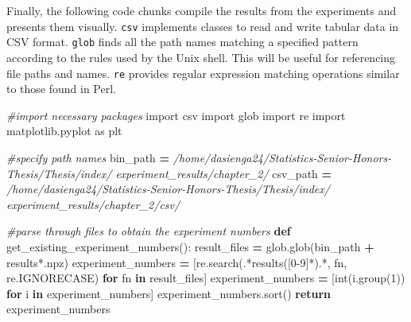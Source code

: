 \documentclass[12pt, twoside]{amherstthesis}
\newenvironment{Shaded}{\begin{snugshade}}{\end{snugshade}}
\newcommand{\BuiltInTok}[1]{#1}
\newcommand{\CommentTok}[1]{\textcolor[rgb]{0.56,0.35,0.01}{\textit{#1}}}
\newcommand{\ControlFlowTok}[1]{\textcolor[rgb]{0.13,0.29,0.53}{\textbf{#1}}}
\newcommand{\DecValTok}[1]{\textcolor[rgb]{0.00,0.00,0.81}{#1}}
\newcommand{\ImportTok}[1]{#1}
\newcommand{\KeywordTok}[1]{\textcolor[rgb]{0.13,0.29,0.53}{\textbf{#1}}}
\newcommand{\NormalTok}[1]{#1}
\newcommand{\OperatorTok}[1]{\textcolor[rgb]{0.81,0.36,0.00}{\textbf{#1}}}
\newcommand{\StringTok}[1]{\textcolor[rgb]{0.31,0.60,0.02}{#1}}
\begin{document}
\noindent Finally, the following code chunks compile the results from the experiments and presents them visually. \texttt{csv} implements classes to read and write tabular data in CSV format. \texttt{glob} finds all the path names matching a specified pattern according to the rules used by the Unix shell. This will be useful for referencing file paths and names. \texttt{re} provides regular expression matching operations similar to those found in Perl.
\begin{Shaded}
\begin{Highlighting}[]
\CommentTok{\#import necessary packages}
\ImportTok{import}\NormalTok{ csv }
\ImportTok{import}\NormalTok{ glob }
\ImportTok{import}\NormalTok{ re }
\ImportTok{import}\NormalTok{ matplotlib.pyplot }\ImportTok{as}\NormalTok{ plt }
\end{Highlighting}
\end{Shaded}
\begin{Shaded}
\begin{Highlighting}[]
\CommentTok{\#specify path names}
\NormalTok{bin\_path }\OperatorTok{=} 
\CommentTok{\textquotesingle{}/home/dasienga24/Statistics{-}Senior{-}Honors{-}Thesis/Thesis/index/\textquotesingle{}}
\CommentTok{\textquotesingle{}experiment\_results/chapter\_2/\textquotesingle{}}
\NormalTok{csv\_path }\OperatorTok{=} 
\CommentTok{\textquotesingle{}/home/dasienga24/Statistics{-}Senior{-}Honors{-}Thesis/Thesis/index/\textquotesingle{}}
\CommentTok{\textquotesingle{}experiment\_results/chapter\_2/csv/}
\end{Highlighting}
\end{Shaded}
\begin{Shaded}
\begin{Highlighting}[]
\CommentTok{\#parse through files to obtain the experiment numbers}
\KeywordTok{def}\NormalTok{ get\_existing\_experiment\_numbers():}
\NormalTok{    result\_files       }\OperatorTok{=}\NormalTok{ glob.glob(bin\_path }\OperatorTok{+} \StringTok{\textquotesingle{}results*.npz\textquotesingle{}}\NormalTok{)}
\NormalTok{    experiment\_numbers }\OperatorTok{=}\NormalTok{ [re.search(}\StringTok{\textquotesingle{}.*results([0{-}9]*).*\textquotesingle{}}\NormalTok{, }
\NormalTok{    fn, re.IGNORECASE) }\ControlFlowTok{for}\NormalTok{ fn }\KeywordTok{in}\NormalTok{ result\_files]}
\NormalTok{    experiment\_numbers }\OperatorTok{=}\NormalTok{ [}\BuiltInTok{int}\NormalTok{(i.group(}\DecValTok{1}\NormalTok{)) }\ControlFlowTok{for}\NormalTok{ i }\KeywordTok{in}\NormalTok{ experiment\_numbers]}
\NormalTok{    experiment\_numbers.sort()}
    \ControlFlowTok{return}\NormalTok{ experiment\_numbers}
\end{Highlighting}
\end{Shaded}
\end{document}
